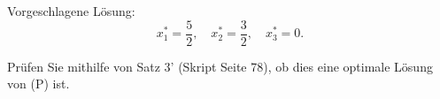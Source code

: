 \documentclass[11pt, a4paper]{article}
\begin{document}
\begin{enumerate}[\bfseries A:]
\begin{enumerate}[\bfseries 1.]
\begin{enumerate}[a)]
Vorgeschlagene Lösung:
\[
x_1^*= \frac{5}{2}, \quad
x_2^*= \frac{3}{2}, \quad
x_3^*= 0.
\]

Prüfen Sie mithilfe von Satz 3' (Skript Seite 78), ob dies eine optimale Lösung von (P) ist.
\end{enumerate}

\end{enumerate}
\end{enumerate}
\end{document}
